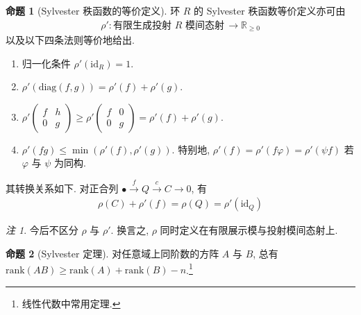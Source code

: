 \documentclass{MainStyle}
\theoremstyle{definition}
\theoremstyle{definition}
\theoremstyle{definition}
\theoremstyle{definition}
\newtheorem{proposition}{命题}
\theoremstyle{definition}
\theoremstyle{definition}
\theoremstyle{definition}
\theoremstyle{remark}
\newtheorem{remark}{注}
\theoremstyle{remark}
\begin{document}
\begin{proposition}[Sylvester 秩函数的等价定义]
    环 $R$ 的 Sylvester 秩函数等价定义亦可由
    \begin{align*}
        \rho':\text{有限生成投射 $R$ 模间态射}\,\to \mathbb R_{\geq 0}
    \end{align*}
    以及以下四条法则等价地给出.
    \begin{enumerate}
        \item 归一化条件 $\rho'(\mathrm{id}_R)=1$.
        \item $\rho'(\mathrm{diag}(f,g))=\rho'(f)+\rho'(g)$.
        \item $\rho'\begin{pmatrix}
                      f & h \\0&g
                  \end{pmatrix}\geq\rho'\begin{pmatrix}
                      f & 0 \\0&g
                  \end{pmatrix}=\rho'(f)+\rho'(g)$.
        \item $\rho'(fg)\leq \min (\rho'(f),\rho'(g))$. 特别地, $\rho'(f)=\rho'(f\varphi)=\rho'(\psi f)$ 若 $\varphi$ 与 $\psi$ 为同构.
    \end{enumerate}
    其转换关系如下. 对正合列 $\bullet\overset f\to Q\overset c\to C\to 0$, 有
    \begin{align*}
        \rho(C)+\rho'(f)=\rho(Q)=\rho'(\mathrm{id}_Q)
    \end{align*}
\end{proposition}

\begin{remark}
    今后不区分 $\rho$ 与 $\rho'$. 换言之, $\rho$ 同时定义在有限展示模与投射模间态射上.
\end{remark}

\begin{proposition}[Sylvester 定理]
    对任意域上同阶数的方阵 $A$ 与 $B$, 总有 $\mathrm{rank}(AB)\geq \mathrm{rank}(A)+\mathrm{rank}(B)-n$.\footnote{线性代数中常用定理.}
\end{proposition}
\end{document}
